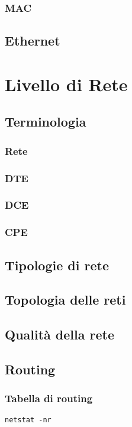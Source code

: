 \documentclass[a4paper,11pt]{paper}
\def\code#1{\texttt{#1}}
\begin{document}
\subsubsection{MAC}

\subsection{Ethernet}


\newpage
\section{Livello di Rete}

\subsection{Terminologia}
\subsubsection{Rete}
\subsubsection{DTE}
\subsubsection{DCE}
\subsubsection{CPE}
\subsection{Tipologie di rete}
\subsection{Topologia delle reti}
\subsection{Qualità della rete}
\subsection{Routing}
\subsubsection{Tabella di routing}
\code{netstat -nr}
\end{document}
